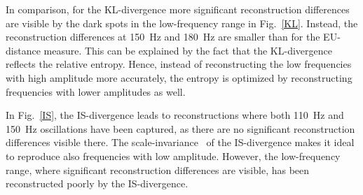 \documentclass[lettersize,journal]{IEEEtran}
\begin{document}
In comparison, for the KL-divergence more significant reconstruction differences are visible by the dark spots in the low-frequency range in Fig.~\ref{KL}.
Instead, the reconstruction differences at 150~Hz and 180~Hz are smaller than for the EU-distance measure. 
This can be explained by the fact that the KL-divergence reflects the relative entropy. Hence, instead of reconstructing the low frequencies with high amplitude more accurately, the entropy is optimized by reconstructing frequencies with lower amplitudes as well.

In Fig.~\ref{IS}, the IS-divergence leads to reconstructions where both 110~Hz and 150~Hz oscillations have been captured, as there are no significant reconstruction differences visible there.
The scale-invariance~\cite{fevotte2009nonnegative} of the IS-divergence makes it ideal to reproduce also frequencies with low amplitude. 
However, the low-frequency range, where significant reconstruction differences are visible, has been reconstructed poorly by the IS-divergence.
\end{document}
